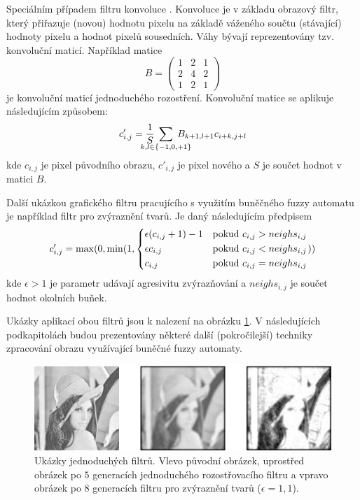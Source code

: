 Speciálním případem filtru konvoluce \cite{Rus-ImaProHan}. Konvoluce je v základu obrazový filtr, který přiřazuje (novou) hodnotu pixelu na základě váženého součtu (stávající) hodnoty pixelu a hodnot pixelů sousedních. Váhy bývají reprezentovány tzv. konvoluční maticí. Například matice
$$
  B = \begin{pmatrix}
       1 & 2 & 1 \\
       2 & 4 & 2 \\
       1 & 2 & 1 
      \end{pmatrix}
$$
je konvoluční maticí jednoduchého rozostření. Konvoluční matice se aplikuje následujícím způsobem:
$$
  c'_{i,j} = \frac{1}{S} \; \sum_{\mathclap{k,l \in \{-1, 0, +1\}}} \; B_{k+1, l+1} c_{i+k, j+l}
$$
kde $c_{i,j}$ je pixel původního obrazu, $c'_{i,j}$ je pixel nového a $S$ je součet hodnot v matici $B$.

Další ukázkou grafického filtru pracujícího s využitím buněčného fuzzy automatu je například filtr pro zvýraznění tvarů. Je daný následujícím předpisem
$$
  c'_{i,j} = \max(0, \min(1, 
    \begin{dcases}
      \epsilon (c_{i,j} + 1) - 1	& \text{pokud $c_{i,j} > neighs_{i,j}$} \\
      \epsilon c_{i,j}			& \text{pokud $c_{i,j} < neighs_{i,j}$} \\
      c_{i,j}	& \text{pokud $c_{i,j} = neighs_{i,j}$} 
    \end{dcases}
    ))
$$
kde $\epsilon > 1$ je parametr udávají agresivitu zvýrazňování a $neighs_{i,j}$ je součet hodnot okolních buňek.

Ukázky aplikací obou filtrů jsou k nalezení na obrázku \ref{img:Filters}. V následujících podkapitolách budou prezentovány některé další (pokročilejší) techniky zpracování obrazu využívající buněčné fuzzy automaty.

\begin{figure}
 \includegraphics[width=\textwidth]{genimg-filters}
 
 \caption[Ukázky jednoduchých filtrů]{Ukázky jednoduchých filtrů. Vlevo původní obrázek, uprostřed obrázek po $5$ generacích jednoduchého rozostřovacího filtru a vpravo obrázek po $8$ generacích filtru pro zvýraznění tvarů ($\epsilon = 1{,}1$).} \label{img:Filters}
\end{figure}

